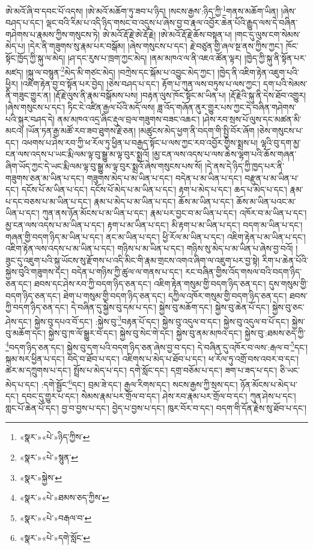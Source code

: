 ཨེ་མའོ་ཞི་བ་དབང་པོ་འདས། །ཨེ་མའོ་མཆོག་ཏུ་ཟབ་པ་ཉིད། །སངས་རྒྱས་:ཉིད་ཀྱི་\footnote{«སྣར་»«པེ་»ཉིད་ཀྱིས་}གནས་མཆོག་ཡིན། །ཞེས་བཤད་པ་དང་། ལྡང་བའི་རིམ་པ་འདི་ཉིད་གསང་བ་འདུས་པ་ཞེས་བྱ་བ་རྣལ་འབྱོར་ཆེན་པོའི་རྒྱུད་ལས་དེ་བཞིན་གཤེགས་པ་རྣམས་ཀྱིས་གསུངས་ཏེ། ཨེ་མའོ་རྡོ་རྗེ་ཨེ་རྡོ་རྗེ། །ཨེ་མའོ་རྡོ་རྗེ་ཆོས་བསྟན་པ། །གང་དུ་ལུས་ངག་སེམས་མེད་པ། །དེར་ནི་གཟུགས་སུ་རྣམ་པར་བསྒོམ། །ཞེས་གསུངས་པ་དང་། རྗེ་བཙུན་གྱི་ཞལ་སྔ་ནས་ཀྱིས་ཀྱང་། ཁོང་སྟོང་ཁྱོད་ཀྱི་སྐུ་ལ་མེད། །ཤ་དང་རུས་པ་ཁྲག་ཀྱང་མེད། །ནམ་མཁའ་ལ་ནི་འཇའ་ཚོན་ལྟར། །ཁྱེད་ཀྱི་སྐུ་ནི་སྟོན་པར་མཛད། །སྐུ་ལ་བསྙུན་\footnote{«སྣར་»«པེ་»སྙུན་}མེད་མི་གཙང་མེད། །བཀྲེས་དང་སྐོམ་པ་འབྱུང་མེད་ཀྱང་། །ཁྱེད་ནི་འཇིག་རྟེན་འཇུག་པའི་ཕྱིར། །འཇིག་རྟེན་བྱ་བ་སྟོན་པར་བྱེད། །ཅེས་བཤད་པ་དང་། རྟོག་པ་ཀུན་ལས་བཏུས་པ་ལས་ཀྱང་། དག་པའི་སེམས་ནི་གཟུང་གྱུར་ན། །རྡོ་རྗེ་ལུས་ནི་རྣམ་བསྒོམས་པས། །བརྟན་ལུས་ཁོང་སྟོང་མ་ཡིན་པ། །རྡོ་རྗེའི་སྐུ་ནི་དེས་ཐོབ་འགྱུར། །ཞེས་གསུངས་པ་དང་། ཏིང་ངེ་འཛིན་རྒྱལ་པོའི་མདོ་ལས། ཟླ་འོད་གཞོན་ནུར་གྱུར་པས་ཀྱང་དེ་བཞིན་གཤེགས་པའི་སྐུར་བཤད་དེ། ནམ་མཁའ་འདྲ་ཞིང་རྡུལ་བྲལ་གཟུགས་བཟང་འཆང་། །ཤེས་རབ་སྲས་པོ་ལུས་དང་མཚན་མི་མངའ། །ཡོན་ཏན་རྒྱ་མཚོ་རབ་ཟབ་ཐུགས་རྗེ་ཅན། །མཚུངས་མེད་ཕྱག་ནི་བདག་གི་སྤྱི་བོར་ཞོག །ཅེས་གསུངས་པ་དང་། འཕགས་པ་ཤེས་རབ་ཀྱི་ཕ་རོལ་ཏུ་ཕྱིན་པ་བརྒྱད་སྟོང་པ་ལས་ཀྱང་རབ་འབྱོར་གྱིས་སྨྲས་པ། ལྷའི་བུ་དག་མྱ་ངན་ལས་འདས་པ་ཡང་རྨི་ལམ་ལྟ་བུ་སྒྱུ་མ་ལྟ་བུར་སྨྲའོ། །མྱ་ངན་ལས་འདས་པ་ལས་ཆེས་ལྷག་པའི་ཆོས་གཞན་ཞིག་ཡོད་ཀྱང་དེ་ཡང་རྨི་ལམ་ལྟ་བུ་སྒྱུ་མ་ལྟ་བུར་སྨྲའོ་ཞེས་གསུངས་པས་སོ། །དེ་ནས་དེ་ཉིད་ཀྱི་ཁྱད་པར་ནི་གཟུགས་ཅན་མ་ཡིན་པ་དང་། གཟུགས་མེད་པ་མ་ཡིན་པ་དང་། བདེན་པ་མ་ཡིན་པ་དང་། བརྫུན་པ་མ་ཡིན་པ་དང་། དངོས་པོ་མ་ཡིན་པ་དང་། དངོས་པོ་མེད་པ་མ་ཡིན་པ་དང་། རྟག་པ་མེད་པ་དང་། ཆད་པ་མེད་པ་དང་། རྣམ་པ་དང་བཅས་པ་མ་ཡིན་པ་དང་། རྣམ་པ་མེད་པ་མ་ཡིན་པ་དང་། ཆོས་མ་ཡིན་པ་དང་། ཆོས་མ་ཡིན་པའང་མ་ཡིན་པ་དང་། ཀུན་ནས་ཉོན་མོངས་པ་མ་ཡིན་པ་དང་། རྣམ་པར་བྱང་བ་མ་ཡིན་པ་དང་། འཁོར་བ་མ་ཡིན་པ་དང་། མྱ་ངན་ལས་འདས་པ་མ་ཡིན་པ་དང་། རྟག་པ་མ་ཡིན་པ་དང་། མི་རྟག་པ་མ་ཡིན་པ་དང་། བདག་མ་ཡིན་པ་དང་། གཞན་གྱི་བདག་ཉིད་མ་ཡིན་པ་དང་། ནང་མ་ཡིན་པ་དང་། ཕྱི་རོལ་མ་ཡིན་པ་དང་། འཇིག་རྟེན་པ་མ་ཡིན་པ་དང་། འཇིག་རྟེན་ལས་འདས་པ་མ་ཡིན་པ་དང་། གཉིས་པ་མ་ཡིན་པ་དང་། གཉིས་སུ་མེད་པ་མ་ཡིན་པ་ཞེས་བྱ་བའོ། །ཟུང་དུ་འཇུག་པའི་སྐུ་ཡོངས་སུ་རྫོགས་པ་འདི་མིང་གི་རྣམ་གྲངས་འགའ་ཞིག་ལ་འཇུག་པར་བྱ་སྟེ། རིག་པ་ཆེན་པོའི་སྐྱེས་བུའི་གཟུགས་དང་། བདེན་པ་གཉིས་ཀྱི་ཚུལ་ལ་གནས་པ་དང་། རང་བཞིན་གྱིས་འོད་གསལ་བའི་བདག་ཉིད་ཅན་དང་། ཐབས་དང་ཤེས་རབ་ཀྱི་བདག་ཉིད་ཅན་དང་། འཇིག་རྟེན་གསུམ་གྱི་བདག་ཉིད་ཅན་དང་། དུས་གསུམ་གྱི་བདག་ཉིད་ཅན་དང་། ཐེག་པ་གསུམ་གྱི་བདག་ཉིད་ཅན་དང་། དཀྱིལ་འཁོར་གསུམ་གྱི་བདག་ཉིད་ཅན་དང་། ཐབས་ཀྱི་བདག་ཉིད་ཅན་དང་། དེ་བཞིན་དུ་སྐྱེས་བུ་དམ་པ་དང་། སྐྱེས་བུ་མཆོག་དང་། སྐྱེས་བུ་ཆེན་པོ་དང་། སྐྱེས་བུ་ཅང་ཤེས་དང་། སྐྱེས་བུ་དཔའ་བོ་དང་། :སྐྱེས་བུ་\footnote{«སྣར་»སྐྱེས་}བརྟན་པོ་དང་། སྐྱེས་བུ་འདུལ་བ་དང་། སྐྱེས་བུ་འདུལ་བ་པོ་དང་། སྐྱེས་བུ་མཆོག་དང་། སྐྱེས་བུ་ཁ་ལོ་སྒྱུར་བ་དང་། སྐྱེས་བུ་སེང་གེ་དང་། སྐྱེས་བུ་ནམ་མཁའ་དང་། སྐྱེས་བུ་:ཐམས་ཅད་ཀྱི་\footnote{«སྣར་»«པེ་»ཐམས་ཅད་ཀྱིས་}བདག་ཉིད་ཅན་དང་། སྐྱེས་བུ་དག་པའི་བདག་ཉིད་ཅན་ཞེས་བྱ་བ་དང་། དེ་བཞིན་དུ་འཁོར་བ་ལས་:རྒལ་བ་\footnote{«སྣར་»«པེ་»བརྒལ་བ་}དང་། སྐམ་སར་ཕྱིན་པ་དང་། བདེ་བ་ཐོབ་པ་དང་། འཇིགས་པ་མེད་པ་ཐོབ་པ་དང་། ཕ་རོལ་ཏུ་འགྲོ་བས་འབར་བ་དང་། ཚེར་མ་དཀྲུགས་པ་དང་། སྤྲོས་པ་མེད་པ་དང་། དགེ་སློང་དང་། དགྲ་བཅོམ་པ་དང་། ཟག་པ་ཟད་པ་དང་། ཅི་ཡང་མེད་པ་དང་། :དགེ་སྦྱོང་\footnote{«སྣར་»«པེ་»དགེ་སློང་}དང་། བྲམ་ཟེ་དང་། རྒྱལ་རིགས་དང་། སངས་རྒྱས་ཀྱི་སྲས་དང་། ཉོན་མོངས་པ་མེད་པ་དང་། དབང་དུ་གྱུར་པ་དང་། སེམས་རྣམ་པར་གྲོལ་བ་དང་། ཤེས་རབ་རྣམ་པར་གྲོལ་བ་དང་། ཀུན་ཤེས་པ་དང་། གླང་པོ་ཆེན་པོ་དང་། བྱ་བ་བྱས་པ་དང་། བྱེད་པ་བྱས་པ་དང་། ཁུར་བོར་བ་དང་། བདག་གི་དོན་རྗེས་སུ་ཐོབ་པ་དང་། 